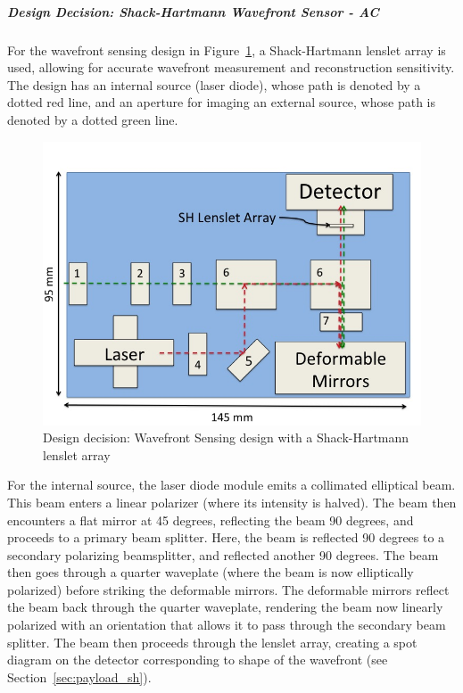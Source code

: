 \documentclass[12pt]{article}
\begin{document}
\subparagraph{Design Decision: Shack-Hartmann Wavefront Sensor - AC}

For the wavefront sensing design in Figure~\ref{fig:SHWFS}, a Shack-Hartmann lenslet array is used, allowing for accurate wavefront measurement and reconstruction sensitivity. The design has an internal source (laser diode), whose path is denoted by a dotted red line, and an aperture for imaging an external source, whose path is denoted by a dotted green line.

\begin{figure}[ht]
\centering
  \includegraphics[width=5in]{images/payload_SHWFS.jpg}
\caption{Design decision: Wavefront Sensing design with a Shack-Hartmann lenslet array}
\label{fig:SHWFS}
\end{figure}

For the internal source, the laser diode module emits a collimated elliptical beam. This beam enters a linear polarizer (where its intensity is halved). The beam then encounters a flat mirror at 45 degrees, reflecting the beam 90 degrees, and proceeds to a primary beam splitter. Here, the beam is reflected 90 degrees to a secondary polarizing beamsplitter, and reflected another 90 degrees. The beam then goes through a quarter waveplate (where the beam is now elliptically polarized) before striking the deformable mirrors. The deformable mirrors reflect the beam back through the quarter waveplate, rendering the beam now linearly polarized with an orientation that allows it to pass through the secondary beam splitter. The beam then proceeds through the lenslet array, creating a spot diagram on the detector corresponding to shape of the wavefront (see Section~\ref{sec:payload_sh}).
\end{document}

